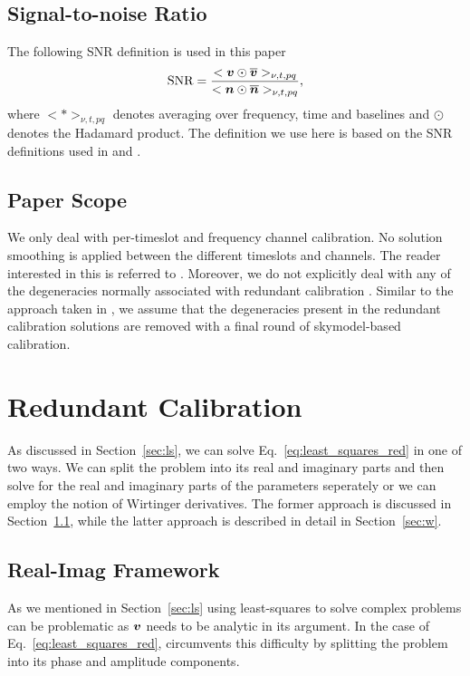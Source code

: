 \documentclass[useAMS,usenatbib]{mn2e}
\newcommand{\bv}{\bmath{v}}
\newcommand{\bn}{\bmath{n}}
\newcommand{\conj}[1]{\overline{#1}}
\begin{document}
\subsection{Signal-to-noise Ratio}
\label{sec:snr}
The following SNR definition is used in this paper  
\begin{equation}
\label{}
\textrm{SNR} = \frac{<\bv\odot\conj{\bv}>_{\nu,t,pq}}{<\bn\odot\conj{\bn}>_{\nu,t,pq}}, 
\end{equation}
where $<*>_{\nu,t,pq}$ denotes averaging over frequency, time and baselines and $\odot$ denotes the Hadamard product. The definition we use here is based on the SNR definitions used in \citet{Liu2010} and \citet{Marthi2014}.

\subsection{Paper Scope}
\label{sec:scope}
We only deal with per-timeslot and frequency channel calibration. No solution smoothing  
is applied between the different timeslots and channels. The reader interested in this is referred to \citep{Zheng2014}. 
Moreover, we do not explicitly deal with any of the degeneracies normally associated with redundant calibration \citep{Zheng2014,Kurien2016}. Similar to the approach taken in \citep{Marthi2014}, we assume that the degeneracies present in the redundant calibration solutions are removed with a final round of skymodel-based calibration.

\section{Redundant Calibration}
As discussed in Section~\ref{sec:ls}, we can solve Eq.~\eqref{eq:least_squares_red} in one of two ways. We can split the problem into its real and
imaginary parts and then solve for the real and imaginary parts of the parameters seperately or we can employ the notion of Wirtinger derivatives. The former 
approach is discussed in Section~\ref{sec:ri}, while the latter approach is described in detail in Section~\ref{sec:w}. 

\subsection{Real-Imag Framework}
\label{sec:ri}
As we mentioned in Section~\ref{sec:ls} using least-squares to solve complex problems can be problematic as $\bv$ needs to be analytic in its argument. In the case 
of Eq.~\eqref{eq:least_squares_red}, \citet{Liu2010} circumvents this difficulty by 
splitting the problem into its phase and amplitude components. 
\end{document}
